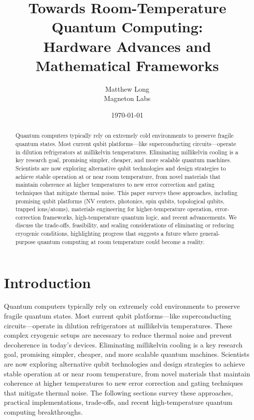 \documentclass[11pt]{article}
\title{\textbf{Towards Room-Temperature Quantum Computing:}\\
Hardware Advances and Mathematical Frameworks}
\author{Matthew Long \\
Magneton Labs}
\date{\today}
\begin{document}
\maketitle

\begin{abstract}
\noindent
Quantum computers typically rely on extremely cold environments to preserve fragile quantum states. Most current qubit platforms---like superconducting circuits---operate in dilution refrigerators at millikelvin temperatures. Eliminating millikelvin cooling is a key research goal, promising simpler, cheaper, and more scalable quantum machines. Scientists are now exploring alternative qubit technologies and design strategies to achieve stable operation at or near room temperature, from novel materials that maintain coherence at higher temperatures to new error correction and gating techniques that mitigate thermal noise. This paper surveys these approaches, including promising qubit platforms (NV centers, photonics, spin qubits, topological qubits, trapped ions/atoms), materials engineering for higher-temperature operation, error-correction frameworks, high-temperature quantum logic, and recent advancements. We discuss the trade-offs, feasibility, and scaling considerations of eliminating or reducing cryogenic conditions, highlighting progress that suggests a future where general-purpose quantum computing at room temperature could become a reality.
\end{abstract}

\section{Introduction}
\label{sec:intro}

Quantum computers typically rely on extremely cold environments to preserve fragile quantum states. Most current qubit platforms---like superconducting circuits---operate in dilution refrigerators at millikelvin temperatures. These complex cryogenic setups are necessary to reduce thermal noise and prevent decoherence in today's devices. Eliminating millikelvin cooling is a key research goal, promising simpler, cheaper, and more scalable quantum machines. Scientists are now exploring alternative qubit technologies and design strategies to achieve stable operation at or near room temperature, from novel materials that maintain coherence at higher temperatures to new error correction and gating techniques that mitigate thermal noise. The following sections survey these approaches, practical implementations, trade-offs, and recent high-temperature quantum computing breakthroughs.
\end{document}
